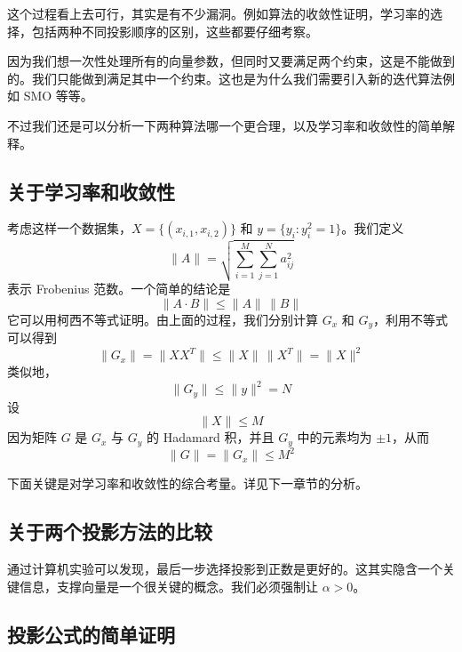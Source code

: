 这个过程看上去可行，其实是有不少漏洞。例如算法的收敛性证明，学习率的选择，包括两种不同投影顺序的区别，这些都要仔细考察。

因为我们想一次性处理所有的向量参数，但同时又要满足两个约束，这是不能做到的。我们只能做到满足其中一个约束。这也是为什么我们需要引入新的迭代算法例如 SMO 等等。

不过我们还是可以分析一下两种算法哪一个更合理，以及学习率和收敛性的简单解释。

\subsection{关于学习率和收敛性}

考虑这样一个数据集，$X=\{ \left(x_{i,1},x_{i,2}\right) \}$ 和 $y = \{y_i:y_i^2=1\}$。我们定义
\begin{equation}
\|A\| = \sqrt{\sum_{i=1}^{M}\sum_{j=1}^{N} a_{ij}^2 }
\end{equation}
表示 Frobenius 范数。一个简单的结论是
\begin{equation}
\|A\cdot B \| \leqslant \|A\|\,\|B\|
\end{equation}
它可以用柯西不等式证明。由上面的过程，我们分别计算 $G_x$ 和 $G_y$，利用不等式可以得到
\begin{equation}
\|G_x\| = \|XX^T\| \leqslant \|X\|\,\|X^T\| = \|X\|^2
\end{equation}
类似地，
\begin{equation}
\|G_y\| \leqslant \|y\|^2 = N
\end{equation}
设
\begin{equation}
\|X\| \leqslant M
\end{equation}
因为矩阵 $G$ 是 $G_x$ 与 $G_y$ 的 Hadamard 积，并且 $G_y$ 中的元素均为 $\pm 1$，从而
\begin{equation}
\|G\| = \|G_x\| \leqslant M^2
\end{equation}

下面关键是对学习率和收敛性的综合考量。详见下一章节的分析。

\subsection{关于两个投影方法的比较}

通过计算机实验可以发现，最后一步选择投影到正数是更好的。这其实隐含一个关键信息，支撑向量是一个很关键的概念。我们必须强制让 $\alpha > 0$。

\subsection{投影公式的简单证明}

